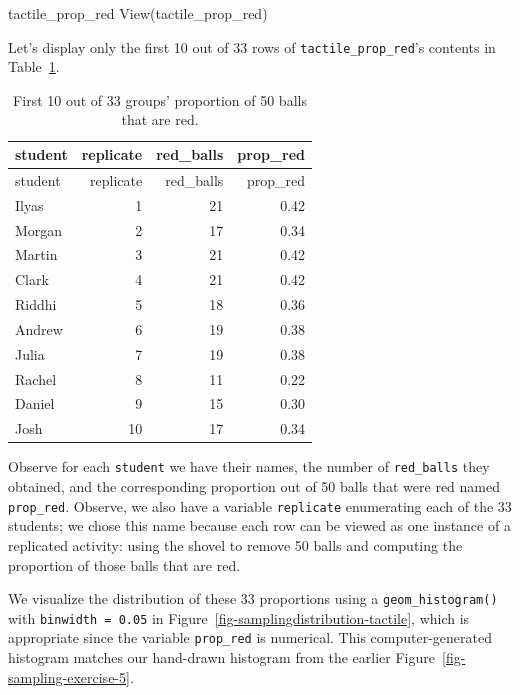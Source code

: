 \documentclass[
  letterpaper,
  DIV=11,
  numbers=noendperiod]{scrreprt}
\newenvironment{Shaded}{\begin{snugshade}}{\end{snugshade}}
\newcommand{\FunctionTok}[1]{\textcolor[rgb]{0.28,0.35,0.67}{#1}}
\newcommand{\NormalTok}[1]{\textcolor[rgb]{0.00,0.23,0.31}{#1}}
\theoremstyle{definition}
\theoremstyle{remark}
\begin{document}
\begin{Shaded}
\begin{Highlighting}[]
\NormalTok{tactile\_prop\_red}
\FunctionTok{View}\NormalTok{(tactile\_prop\_red)}
\end{Highlighting}
\end{Shaded}

Let's display only the first 10 out of 33 rows of
\texttt{tactile\_prop\_red}'s contents in Table~\ref{tbl-tactilered}.

\hypertarget{tbl-tactilered}{}
\begin{longtable}[]{@{}lrrr@{}}
\caption{\label{tbl-tactilered}First 10 out of 33 groups' proportion of
50 balls that are red.}\tabularnewline
\toprule\noalign{}
student & replicate & red\_balls & prop\_red \\
\midrule\noalign{}
\endfirsthead
\toprule\noalign{}
student & replicate & red\_balls & prop\_red \\
\midrule\noalign{}
\endhead
\bottomrule\noalign{}
\endlastfoot
Ilyas & 1 & 21 & 0.42 \\
Morgan & 2 & 17 & 0.34 \\
Martin & 3 & 21 & 0.42 \\
Clark & 4 & 21 & 0.42 \\
Riddhi & 5 & 18 & 0.36 \\
Andrew & 6 & 19 & 0.38 \\
Julia & 7 & 19 & 0.38 \\
Rachel & 8 & 11 & 0.22 \\
Daniel & 9 & 15 & 0.30 \\
Josh & 10 & 17 & 0.34 \\
\end{longtable}

Observe for each \texttt{student} we have their names, the number of
\texttt{red\_balls} they obtained, and the corresponding proportion out
of 50 balls that were red named \texttt{prop\_red}. Observe, we also
have a variable \texttt{replicate} enumerating each of the 33 students;
we chose this name because each row can be viewed as one instance of a
replicated activity: using the shovel to remove 50 balls and computing
the proportion of those balls that are red.

We visualize the distribution of these 33 proportions using a
\texttt{geom\_histogram()} with \texttt{binwidth\ =\ 0.05} in
Figure~\ref{fig-samplingdistribution-tactile}, which is appropriate
since the variable \texttt{prop\_red} is numerical. This
computer-generated histogram matches our hand-drawn histogram from the
earlier Figure~\ref{fig-sampling-exercise-5}.
\end{document}
